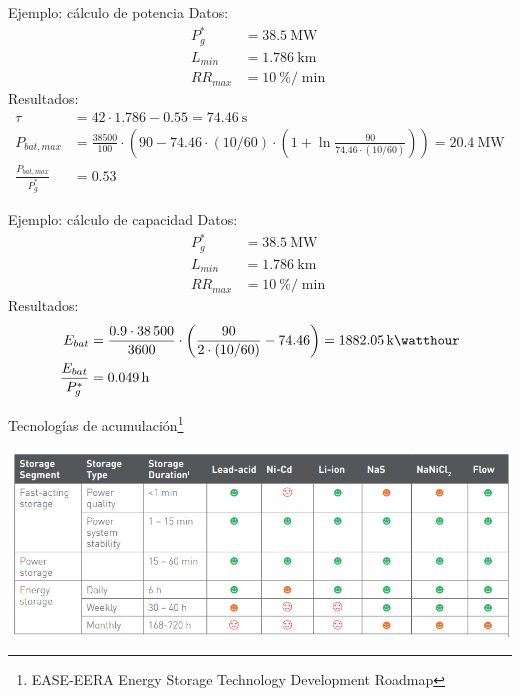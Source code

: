 \documentclass[aspectratio=169, usenames,svgnames,dvipsnames]{beamer}
\begin{document}
\begin{frame}[label={sec:orgc77e6ec}]{Ejemplo: cálculo de potencia}
Datos:
\begin{align*}
  P_g^* &= \qty{38.5}{\mega\watt}\\
  L_{min} &= \qty{1.786}{\kilo\meter}\\
  RR_{max} &= \qty{10}{\%\per\min}
\end{align*}
Resultados:
\begin{align*}
  \tau &= 42 \cdot \num{1.786} - \num{0.55} = \qty{74.46}{\second}\\
  P_{bat,max} &= \frac{\num{38500}}{100} \cdot \left(90 - \num{74.46} \cdot (10/60) \cdot \left( 1 + \ln\frac{90}{\num{74.46} \cdot (10/60)}\right) \right) = \qty{20.4}{\mega\watt}\\
  \frac{P_{bat,max}}{P_g^*} &= \num{0.53}
\end{align*}
\end{frame}

\begin{frame}[label={sec:orgc13eeda}]{Ejemplo: cálculo de capacidad}
Datos:
\begin{align*}
  P_g^* &= \qty{38.5}{\mega\watt}\\
  L_{min} &= \qty{1.786}{\kilo\meter}\\
  RR_{max} &= \qty{10}{\%\per\min}
\end{align*}
Resultados:
\begin{align*}
  E_{bat} &= \frac{\num{0.9} \cdot \num{38500}}{\num{3600}} \cdot \left( \frac{90}{2 \cdot (10/60)} - \num{74.46} \right) = \qty{1882.05}{\kilo\watthour}\\
  \frac{E_{bat}}{P_g^*} &= \qty{0.049}{\hour} 
\end{align*}
\end{frame}

\begin{frame}[label={sec:org0e74b1b}]{Tecnologías de acumulación\footnote{EASE-EERA Energy Storage Technology Development Roadmap}}
\begin{center}
\includegraphics[width=\textwidth]{../figs/ComparativaTecnologiasAcumulacion.png}
\end{center}
\end{frame}
\end{document}
